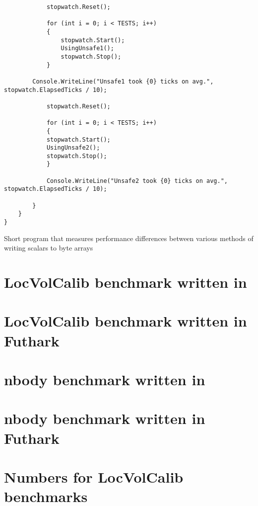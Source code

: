 \begin{appendices}
\begin{verbatim}
            stopwatch.Reset();

            for (int i = 0; i < TESTS; i++)
            {
                stopwatch.Start();
                UsingUnsafe1();
                stopwatch.Stop();
            }

        Console.WriteLine("Unsafe1 took {0} ticks on avg.", stopwatch.ElapsedTicks / 10);
            
            stopwatch.Reset();
            
            for (int i = 0; i < TESTS; i++)
            {
            stopwatch.Start();
            UsingUnsafe2();
            stopwatch.Stop();
            }
                
            Console.WriteLine("Unsafe2 took {0} ticks on avg.", stopwatch.ElapsedTicks / 10);

        }
    }
}
\end{verbatim}
{Short \csharp{} program that measures performance differences between
  various methods of writing scalars to byte arrays}
\label{fig:memoryperformancebenchmark}

\chapter{LocVolCalib benchmark written in \fshark{}}
\label{app:fsharklocvolcalib}
\chapter{LocVolCalib benchmark written in Futhark}
\label{app:futharklocvolcalib}

\chapter{nbody benchmark written in \fshark{}}
\label{app:fsharknbody}
\chapter{nbody benchmark written in Futhark}
\label{app:futharknbody}












\chapter{Numbers for LocVolCalib benchmarks}





\end{appendices}
